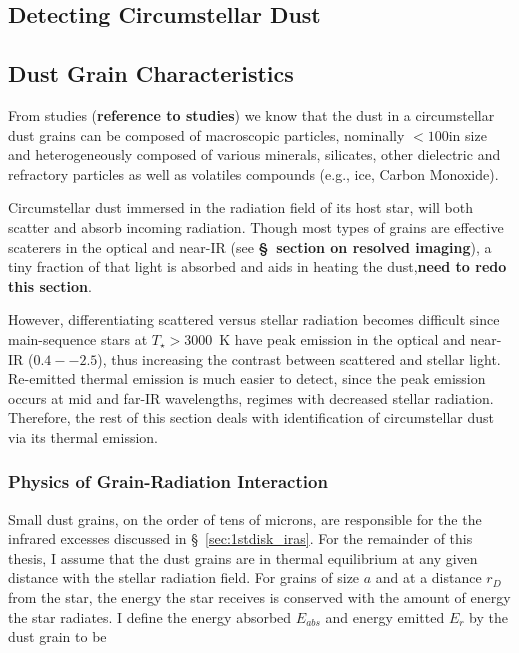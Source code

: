   
    \subsection{Detecting Circumstellar Dust}\label{sec:excess_detection}

        \subsection{Dust Grain Characteristics}            
            
        From studies (\textbf{reference to studies}) we know that the dust in a circumstellar dust grains can be composed of macroscopic particles, nominally $<100$\micron in size and heterogeneously composed of various minerals, silicates, other dielectric and refractory particles as well as volatiles compounds (e.g., ice, Carbon Monoxide). 
                    
        Circumstellar dust immersed in the radiation field of its host star, will both scatter and absorb incoming radiation. Though most types of grains are effective scaterers in the optical and near-IR (see \textbf{\S~section on resolved imaging}), a tiny fraction of that light is absorbed and aids in heating the dust,\textbf{need to redo this section}.
        
        However, differentiating scattered versus stellar radiation becomes difficult since main-sequence stars at $T_\star>3000$~K have peak emission in the optical and near-IR ($0.4--2.5$\micron), thus increasing the contrast between scattered and stellar light. Re-emitted thermal emission is much easier to detect, since the peak emission occurs at mid and far-IR wavelengths, regimes with decreased stellar radiation. Therefore, the rest of this section deals with identification of circumstellar dust via its thermal emission.  
        
        
        \subsubsection{Physics of Grain-Radiation Interaction}            
            
            Small dust grains, on the order of tens of microns, are responsible for the the infrared excesses discussed in \S~\ref{sec:1stdisk_iras}. For the remainder of this thesis, I assume that the dust grains are in thermal equilibrium at any given distance with the stellar radiation field. For grains of size $a$ and at a distance $r_D$ from the star, the energy the star receives is conserved with the amount of energy the star radiates. I define the energy absorbed $E_{abs}$ and energy emitted $E_{r}$ by the dust grain to be
            
